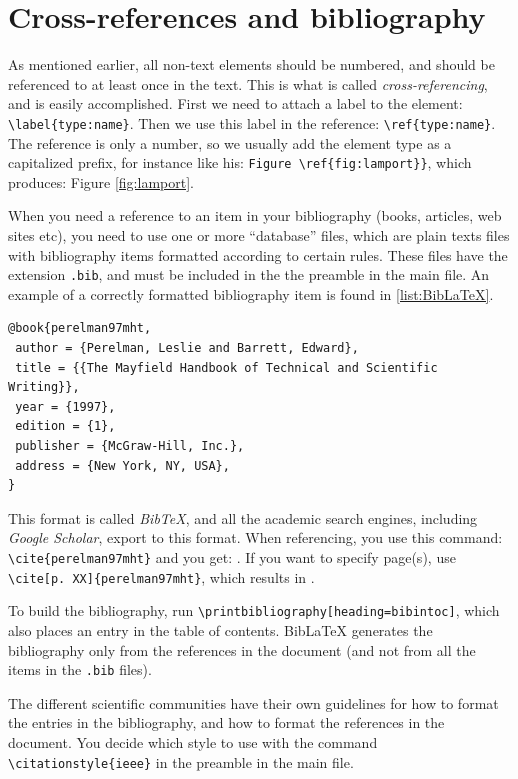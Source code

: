 \section{Cross-references and bibliography}

As mentioned earlier, all non-text elements should be numbered, and should be referenced to at least once in the text.
This is what is called {\em cross-referencing}, and is easily accomplished.
First we need to attach a label to the element: \verb|\label{type:name}|. Then we use this label in the reference: \verb|\ref{type:name}|. The reference is only a number, so we usually add the element type as a capitalized prefix, for instance like his: \verb|Figure \ref{fig:lamport}}|, which produces: Figure \ref{fig:lamport}.

When you need a reference to an item in your bibliography (books, articles, web sites etc), you need to use one or more ``database'' files, which are plain texts files with bibliography items formatted according to certain rules. These files have the extension \texttt{.bib}, and must be included in the the preamble in the main file.
An example of a correctly formatted bibliography item is found in \ref{list:BibLaTeX}.

\begin{lstlisting}[caption=BibLaTeX entry,label=list:BibLaTeX,language=Tex,float=!htbp]
 @book{perelman97mht,
 author = {Perelman, Leslie and Barrett, Edward},
 title = {{The Mayfield Handbook of Technical and Scientific Writing}},
 year = {1997},
 edition = {1},
 publisher = {McGraw-Hill, Inc.},
 address = {New York, NY, USA},
} 
\end{lstlisting} 


This format is called  {\em BibTeX}, and all the academic search engines, including
 {\em Google Scholar}, export to this format.
When referencing, you use this command: \verb| \cite{perelman97mht}|
and you get:  \cite{perelman97mht}. If you want to specify page(s), use \verb|\cite[p. XX]{perelman97mht}|, which results in \cite[p. XX]{perelman97mht}.
 
To build the bibliography, run \verb|\printbibliography[heading=bibintoc]|, which also places an entry in the table of contents.
BibLaTeX generates the  bibliography only from the references in the document (and not from all the items in the \texttt{.bib} files).

The different scientific communities have their own guidelines for how to format the entries in the bibliography, and how to format the references in the document.
You decide which style to use with the command \verb|\citationstyle{ieee}| in the preamble in the main file.


